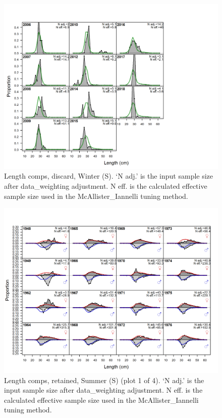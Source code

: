 \documentclass[12pt,]{article}
\begin{document}
\begin{figure}
\centering
\includegraphics{r4ss/plots_mod1/comp_lenfit_flt3mkt1.png}
\caption{Length comps, discard, Winter (S). `N adj.' is the input sample
size after data\_weighting adjustment. N eff. is the calculated
effective sample size used in the McAllister\_Iannelli tuning method.
\label{fig:length_fits}}
\end{figure}

\begin{figure}
\centering
\includegraphics{r4ss/plots_mod1/comp_lenfit_flt4mkt2_page1.png}
\caption{Length comps, retained, Summer (S) (plot 1 of 4). `N adj.' is
the input sample size after data\_weighting adjustment. N eff. is the
calculated effective sample size used in the McAllister\_Iannelli tuning
method. \label{fig:length_fits}}
\end{figure}
\end{document}

